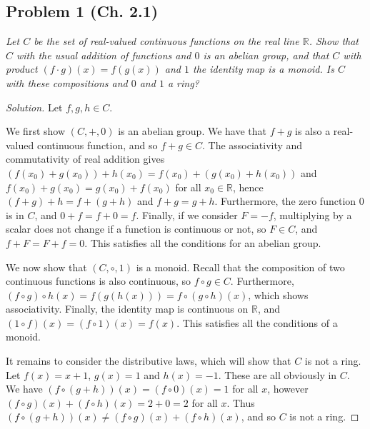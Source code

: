 \documentclass{article}
\newcommand{\R}{{\mathbb R}}
\begin{document}
\subsection*{Problem 1 (Ch. 2.1)}
{\it Let $C$ be the set of real-valued continuous functions on the real line $\R$.
Show that $C$ with the usual addition of functions and $0$ is an abelian group,
and that $C$ with product $(f\cdot g)(x) = f(g(x))$ and $1$ the identity map is a monoid.
Is $C$ with these compositions and $0$ and $1$ a ring?}
\begin{proof}[Solution]\let\qed\relax
	Let $f,g,h \in C$.

	We first show $(C,+,0)$ is an abelian group.
	We have that $f + g$ is also a real-valued continuous function,
	and so $f + g \in C$.
	The associativity and commutativity of real addition gives
	$(f(x_0) + g(x_0)) + h(x_0) = f(x_0) + (g(x_0) + h(x_0))$
	and $f(x_0) + g(x_0) = g(x_0) + f(x_0)$
	for all $x_0 \in \R$, hence $(f + g) + h = f + (g + h)$ and $f + g = g + h$.
	Furthermore, the zero function $0$ is in $C$,
	and $0 + f = f + 0 = f$.
	Finally, if we consider $F = -f$,
	multiplying by a scalar does not change if a function is continuous or not,
	so $F \in C$,
	and $f + F = F + f = 0$.
	This satisfies all the conditions for an abelian group.
	
	We now show that $(C, \circ, 1)$ is a monoid.
	Recall that the composition of two continuous functions is also continuous,
	so $f \circ g \in C$.
	Furthermore, $(f \circ g)\circ h(x) = f(g(h(x))) = f \circ (g \circ h)(x)$,
	which shows associativity.
	Finally, the identity map is continuous on $\R$,
	and $(1 \circ f)(x) = (f \circ 1)(x) = f(x)$.
	This satisfies all the conditions of a monoid.

	It remains to consider the distributive laws, which will show that $C$ is not a ring.
	Let $f(x) = x + 1$, $g(x) = 1$ and $h(x) = -1$.
	These are all obviously in $C$.
	We have $(f\circ(g+h))(x) = (f\circ0)(x) = 1$ for all $x$,
	however $(f \circ g)(x) + (f \circ h)(x) = 2 + 0 = 2$ for all $x$.
	Thus $(f\circ(g+h))(x) \neq (f \circ g)(x) + (f \circ h)(x)$,
	and so $C$ is not a ring.
\end{proof}
\end{document}

